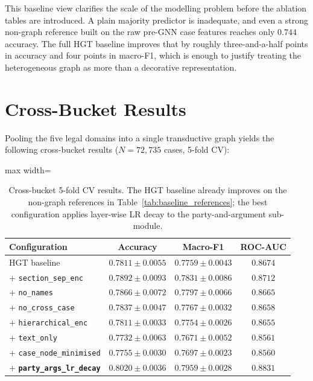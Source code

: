 {This baseline view clarifies the scale of the modelling
problem before the ablation tables are introduced. A plain majority
predictor is inadequate, and even a strong non-graph reference built on
the raw pre-GNN case features reaches only $0.744$ accuracy. The full
HGT baseline improves that by roughly three-and-a-half points in
accuracy and four points in macro-F1, which is enough to justify
treating the heterogeneous graph as more than a decorative
representation.\par}

\section{Cross-Bucket Results}
\label{sec:main_results}

Pooling the five legal domains into a single transductive graph yields
the following cross-bucket results ($N\!=\!72{,}735$ cases, 5-fold CV):

\begin{table}[H]
  \centering
  \small
  \begin{adjustbox}{max width=\textwidth}
  \begin{tabular}{lccc}
    \toprule
    Configuration & Accuracy & Macro-F1 & ROC-AUC \\
    \midrule
    HGT baseline                      & $0.7811\pm0.0055$ & $0.7759\pm0.0043$ & $0.8674$ \\
    + \texttt{section\_sep\_enc}      & $0.7892\pm0.0093$ & $0.7831\pm0.0086$ & $0.8712$ \\
    + \texttt{no\_names}              & $0.7866\pm0.0072$ & $0.7797\pm0.0066$ & $0.8665$ \\
    + \texttt{no\_cross\_case}        & $0.7837\pm0.0047$ & $0.7767\pm0.0032$ & $0.8658$ \\
    + \texttt{hierarchical\_enc}      & $0.7811\pm0.0033$ & $0.7754\pm0.0026$ & $0.8655$ \\
    + \texttt{text\_only}             & $0.7732\pm0.0063$ & $0.7671\pm0.0052$ & $0.8561$ \\
    + \texttt{case\_node\_minimised}  & $0.7755\pm0.0030$ & $0.7697\pm0.0023$ & $0.8560$ \\
    \midrule
    + \textbf{\texttt{party\_args\_lr\_decay}} & $\mathbf{0.8020\pm0.0036}$ &
      $\mathbf{0.7959\pm0.0028}$ & $\mathbf{0.8831}$ \\
    \bottomrule
  \end{tabular}
  \end{adjustbox}
  \caption{Cross-bucket 5-fold CV results. The HGT baseline already
  improves on the non-graph references in
  Table~\ref{tab:baseline_references}; the best configuration applies
  layer-wise LR decay to the party-and-argument sub-module.}
  \label{tab:cross_bucket_results}
\end{table}

